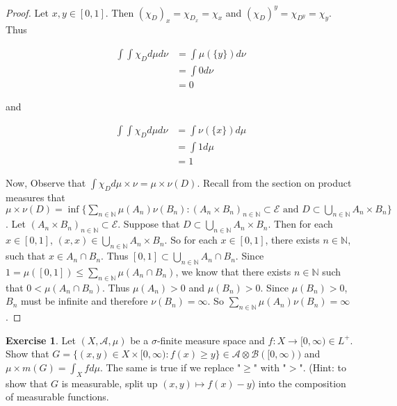\documentclass[12pt]{amsart}
\theoremstyle{definition}
\newtheorem{ex}[definition]{Exercise}
\newcommand{\sig}{\sigma}
\newcommand{\N}{\mathbb{N}}
\newcommand{\MA}{\mathcal{A}}
\newcommand{\MB}{\mathcal{B}}
\newcommand{\ME}{\mathcal{E}}
\newcommand{\Rg}{[0,\infty)}
\newcommand{\lex}[1]{\label{ex:#1}}
\begin{document}
	\begin{proof}
		Let $x,y \in [0,1]$. Then $(\chi_D)_x = \chi_{D_x} = \chi_{x}$ and $(\chi_D)^y = \chi_{D^y} = \chi_{y}$. Thus
		
		\begin{align*}
			\int \int \chi_D d\mu d \nu
			&= \int \mu(\{y\}) d\nu\\
			&= \int 0 d\nu\\
			&= 0
		\end{align*}
		
		and
		
		\begin{align*}
			\int \int \chi_D d\mu d \nu
			&= \int \nu(\{x\}) d\mu\\
			&= \int 1 d\mu\\
			&= 1
		\end{align*}
		
		Now, Observe that $\int \chi_D d\mu \times \nu = \mu \times \nu(D)$. Recall from the section on product measures that $\mu \times \nu(D) = \inf \{\sum_{n \in \N}\mu(A_n)\nu(B_n): (A_n \times B_n)_{n \in \N} \subset \ME \text{ and } D \subset \bigcup_{n \in \N} A_n \times B_n \}$. Let $(A_n \times B_n)_{n \in \N} \subset \ME$. Suppose that $D \subset \bigcup_{n \in \N}A_n \times B_n$. Then for each $x \in [0,1]$, $(x,x) \in  \bigcup_{n \in \N} A_n \times B_n$. So for each $x \in [0,1]$, there exists $n \in \N$, such that $x \in A_n \cap B_n$. Thus $[0,1] \subset \bigcup_{n \in \N} A_n \cap B_n.$ Since $1  = \mu([0,1]) \leq \sum_{n \in \N}\mu(A_n \cap B_n)$, we know that there exists $n \in \N$ such that $0 < \mu(A_n \cap B_n)$. Thus $\mu(A_n)> 0$ and $\mu(B_n) > 0$. Since $\mu(B_n) > 0$, $B_n$ must be infinite and therefore $\nu(B_n) = \infty$. So $\sum_{n \in \N} \mu(A_n)\nu(B_n) = \infty$.
		
	\end{proof}
	
	\begin{ex} \lex{00000} 
		Let $(X, \MA, \mu)$ be a $\sig$-finite measure space and $f:X \rightarrow \Rg \in L^+$. Show that $G = \{(x,y) \in X \times \Rg: f(x) \geq y\} \in \MA \otimes \MB(\Rg)$ and $\mu \times m (G) = \int_X f d \mu$. The same is true if we replace "$\geq$" with "$>$". (Hint: to show that $G$ is measurable, split up $(x,y) \mapsto f(x) - y$) into the composition of measurable functions. 
	\end{ex}
	
\end{document}
